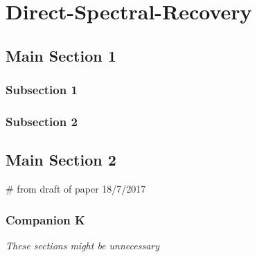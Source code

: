 

\chapter{Direct-Spectral-Recovery}  %

\label{Chapter3} 


\section{Main Section 1}



\subsection{Subsection 1}



\subsection{Subsection 2}


\section{Main Section 2}



# from draft of paper 18/7/2017
\subsection{Companion K}
\label{sec:companion_RV}
\emph{These sections might be unnecessary}\\

